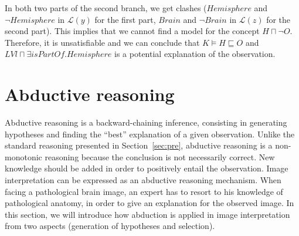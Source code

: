 \documentclass{article}
\begin{document}
\begin{center}
\end{center}

In both two parts of the second branch, we get clashes ($Hemisphere$ and $\neg Hemisphere$ in $\mathcal{L}(y)$ for the first part, $Brain$ and $\neg Brain$ in $\mathcal{L}(z)$ for the second part).
This implies that we cannot find a model for the concept $H\sqcap \neg O$. Therefore, it is unsatisfiable and we can conclude that $K\vDash H\sqsubseteq O$ and $LVl\sqcap \exists isPartOf.Hemisphere$ is a potential
explanation of the observation.
\section{Abductive reasoning}\label{sec:abd}
Abductive reasoning is a backward-chaining inference, consisting in generating hypotheses and finding the ``best'' explanation of a given observation.
Unlike the standard reasoning presented in Section~\ref{sec:pre}, abductive reasoning is a non-monotonic reasoning because the conclusion is not necessarily correct.
New knowledge should be added in order to positively entail the observation.
Image interpretation can be expressed as an abductive reasoning  mechanism.
When facing a pathological brain image, an expert has to resort to his knowledge of pathological anatomy, in order to give  an explanation for the observed image. 
In this section, we will introduce how abduction is applied in image interpretation from two aspects (generation of hypotheses and selection).

\end{document}
